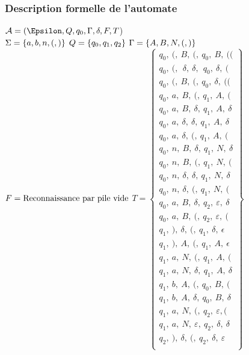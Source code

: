 \documentclass{Support}
\begin{document}
\subsubsection*{Description formelle de l'automate}
\noindent
$\mathcal A = (\Epsilon, Q,q_0, \Gamma,\delta,F,T$) \\
\noindent
$\Sigma = \{a,b,n,(,)\} \\$
$Q = \{q_0,q_1,q_2\} \\$
$\Gamma = \{A,B,N,(,)\} \\$
$F = \mbox{Reconnaissance par pile vide} \\$
$
    T=
      \begin{Bmatrix} 
        q_0,\ (,\  B,\ (,\ q_0, \ B,\ (( \\
        q_0,\  (,\ \ \delta,\  \delta,\  \ q_0,\ \delta,\ ( \\
        q_0,\ (,\ B,\ (,\ q_0,\ \delta,\ (( \\
        q_0,\ a,\ B,\ (,\ q_1,\ A,\ ( \\
        q_0,\ a,\ B,\ \delta,\ q_1,\ A,\ \delta \\
        q_0,\ a,\ \delta,\ \delta,\ q_1,\ A,\ \delta \\
        q_0,\ a,\ \delta,\ (,\ q_1,\ A,\ ( \\
        q_0,\ n,\ B,\ \delta,\ q_1,\ N,\ \delta\\
        q_0,\ n,\ B,\ (,\ q_1,\ N,\ (\\
        q_0,\ n,\ \delta,\ \delta,\ q_1,\ N,\ \delta\\
        q_0,\ n,\ \delta,\ (,\ q_1,\ N,\ (\\
        q_0,\ a,\ B,\ \delta,\ q_2,\ \varepsilon,\ \delta \\
        q_0,\ a,\ B,\ (,\ q_2,\ \varepsilon,\ ( \\
        q_1,\ ),\ \delta,\ (,\ q_1,\ \delta,\ \epsilon \\
        q_1,\ ),\ A,\ (,\ q_1,\ A,\ \epsilon \\
        q_1,\ a,\ N,\ (,\ q_1,\ A,\ ( \\
        q_1,\ a,\ N,\ \delta,\ q_1,\ A,\ \delta \\
        q_1,\ b,\ A,\ (,\ q_0,\ B,\ ( \\
        q_1,\ b,\ A,\ \delta,\ q_0,\ B,\ \delta \\
        q_1,\ a,\ N,\ (,\ q_2,\ \varepsilon,( \\
        q_1,\ a,\ N,\ \varepsilon,\ q_2,\ \delta,\ \delta \\
        q_2,\ ),\ \delta,\ (,\ q_2,\ \delta,\ \varepsilon \\
       \end{Bmatrix}
$
\end{document}
